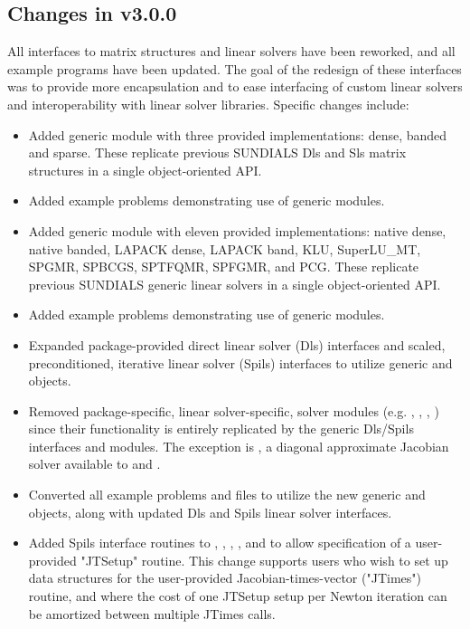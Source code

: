 \subsection*{Changes in v3.0.0}

All interfaces to matrix structures and linear solvers 
have been reworked, and all example programs have been updated. 
The goal of the redesign of these interfaces was to provide more encapsulation
and to ease interfacing of custom linear solvers and interoperability 
with linear solver libraries.
Specific changes include:
\begin{itemize}
\item Added generic {\sunmatrix} module with three provided implementations:
        dense, banded and sparse.  These replicate previous SUNDIALS Dls and
        Sls matrix structures in a single object-oriented API.
\item Added example problems demonstrating use of generic {\sunmatrix} modules.
\item Added generic  module with eleven provided
        implementations: {\sundials} native dense, {\sundials} native banded, 
        LAPACK dense, LAPACK band, KLU,
        SuperLU\_MT, SPGMR, SPBCGS, SPTFQMR, SPFGMR, and PCG.  These replicate
        previous SUNDIALS generic linear solvers in a single object-oriented
        API.
\item Added example problems demonstrating use of generic 
        modules.
\item Expanded package-provided direct linear solver (Dls) interfaces and
        scaled, preconditioned, iterative linear solver (Spils) interfaces
        to utilize generic {\sunmatrix} and  objects.
\item Removed package-specific, linear solver-specific, solver modules
        (e.g. , , , ) since their functionality
        is entirely replicated by the generic Dls/Spils interfaces and
         modules.  The exception is , a
        diagonal approximate Jacobian solver available to {\cvode} and {\cvodes}.
\item Converted all {\sundials} example problems and files to utilize the new generic
        {\sunmatrix} and  objects, along with updated Dls and
        Spils linear solver interfaces.
\item Added Spils interface routines to {\arkode}, {\cvode}, {\cvodes}, {\ida},
        and {\idas} to allow specification of a user-provided "JTSetup" routine.
        This change supports users who wish to set up data structures for
        the user-provided Jacobian-times-vector ("JTimes") routine, and
        where the cost of one JTSetup setup per Newton iteration can be
        amortized between multiple JTimes calls.
\end{itemize}

